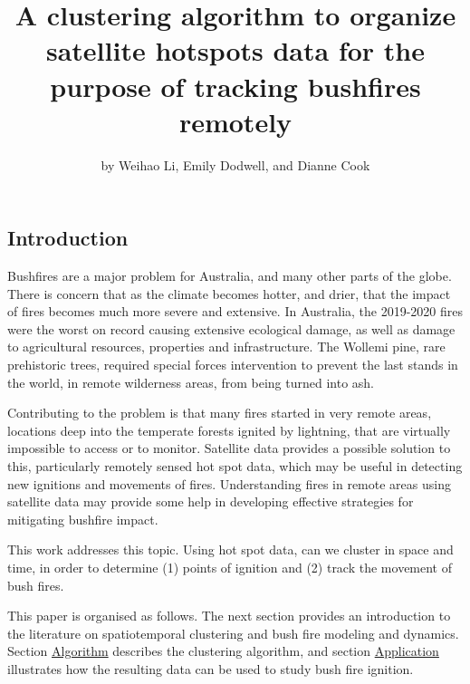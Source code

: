 \title{A clustering algorithm to organize satellite hotspots data for the
purpose of tracking bushfires remotely}
\author{by Weihao Li, Emily Dodwell, and Dianne Cook}

\maketitle


\hypertarget{introduction}{%
\subsection{Introduction}\label{introduction}}

Bushfires are a major problem for Australia, and many other parts of the
globe. There is concern that as the climate becomes hotter, and drier,
that the impact of fires becomes much more severe and extensive. In
Australia, the 2019-2020 fires were the worst on record causing
extensive ecological damage, as well as damage to agricultural
resources, properties and infrastructure. The Wollemi pine, rare
prehistoric trees, required special forces intervention to prevent the
last stands in the world, in remote wilderness areas, from being turned
into ash.

Contributing to the problem is that many fires started in very remote
areas, locations deep into the temperate forests ignited by lightning,
that are virtually impossible to access or to monitor. Satellite data
provides a possible solution to this, particularly remotely sensed hot
spot data, which may be useful in detecting new ignitions and movements
of fires. Understanding fires in remote areas using satellite data may
provide some help in developing effective strategies for mitigating
bushfire impact.

This work addresses this topic. Using hot spot data, can we cluster in
space and time, in order to determine (1) points of ignition and (2)
track the movement of bush fires.

This paper is organised as follows. The next section provides an
introduction to the literature on spatiotemporal clustering and bush
fire modeling and dynamics. Section
\protect\hyperlink{algorithm}{Algorithm} describes the clustering
algorithm, and section \protect\hyperlink{application}{Application}
illustrates how the resulting data can be used to study bush fire
ignition.

